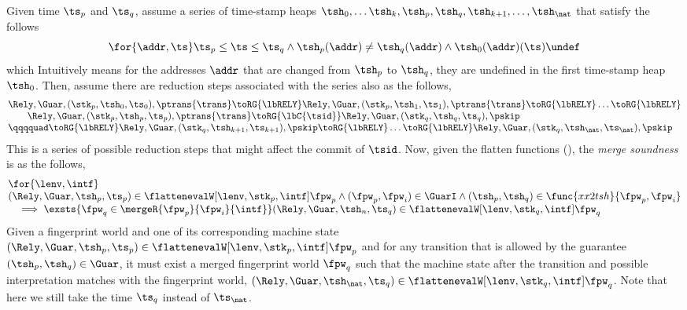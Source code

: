 \begin{lem}
\label{lem:merge-sound}
Given time \( \ts_{p} \) and \( \ts_{q} \), assume a series of time-stamp heaps \( \tsh_{0}, \dots \tsh_{k}, \tsh_{p}, \tsh_{q}, \tsh_{k+1}, \dots, \tsh_{\nat} \) that satisfy the follows
\[
    \for{\addr, \ts} 
    \ts_{p} \leq \ts \leq \ts_{q}
    \land \tsh_{p}(\addr) \neq \tsh_{q}(\addr)
    \land \tsh_{0}(\addr)(\ts) \undef
\]
which Intuitively means for the addresses \( \addr \) that are changed from \( \tsh_{p} \) to \( \tsh_{q} \), they are undefined in the first time-stamp heap \( \tsh_{0} \).
Then, assume there are reduction steps associated with the series also as the follows,
\[
\begin{array}{@{}l@{}}
    \Rely, \Guar, (\stk_{p}, \tsh_{0}, \ts_{0}), \ptrans{\trans} \toRG{\lbRELY} \Rely, \Guar, (\stk_{p}, \tsh_{1}, \ts_{1}), \ptrans{\trans}  \toRG{\lbRELY} \dots  \toRG{\lbRELY} \\
    \qquad \Rely, \Guar, (\stk_{p}, \tsh_{p}, \ts_{p}),  \ptrans{\trans} \toRG{\lbC{\tsid}} \Rely, \Guar, (\stk_{q}, \tsh_{q}, \ts_{q}),  \pskip \\
    \qqqquad \toRG{\lbRELY} \Rely, \Guar, (\stk_{q}, \tsh_{k+1}, \ts_{k+1}), \pskip \toRG{\lbRELY} \dots \toRG{\lbRELY} \Rely, \Guar, (\stk_{q}, \tsh_{\nat}, \ts_{\nat}), \pskip
\end{array}
\]
This is a series of possible reduction steps that might affect the commit of \( \tsid \).
Now, given the flatten functions (), the \emph{merge soundness} is as the follows,
\[
\begin{array}{@{}l@{}}
    \for{ \lenv, \intf}  \\
    (\Rely, \Guar, \tsh_{p}, \ts_{p}) \in \flattenevalW[\lenv, \stk_{p}, \intf]{\fpw_{p}}
    \land (\fpw_{p}, \fpw_{i} ) \in \GuarI
    \land (\tsh_{p}, \tsh_{q}) \in \func{xx2tsh}{\fpw_{p}, \fpw_{i}} \\
    \quad \implies \exsts{\fpw_{q} \in \mergeR{\fpw_{p}}{\fpw_{i}}{\intf}}
    (\Rely, \Guar, \tsh_{n}, \ts_{q}) \in \flattenevalW[\lenv, \stk_{q}, \intf]{\fpw_{q}}
\end{array}
\]
Given a fingerprint world  and one of its corresponding machine state \( (\Rely, \Guar, \tsh_{p}, \ts_{p}) \in \flattenevalW[\lenv, \stk_{p}, \intf]{\fpw_{p}} \) and for any transition that is allowed by the guarantee \( (\tsh_{p}, \tsh_{q}) \in \Guar \), it must exist a merged fingerprint world \( \fpw_{q} \) such that the machine state after the transition and possible interpretation matches with the fingerprint world, \ie \((\Rely, \Guar, \tsh_{\nat}, \ts_{q}) \in \flattenevalW[\lenv, \stk_{q}, \intf]{\fpw_{q}}\).
Note that here we still take the time \( \ts_{q} \) instead of \( \ts_{\nat} \).
\end{lem}
